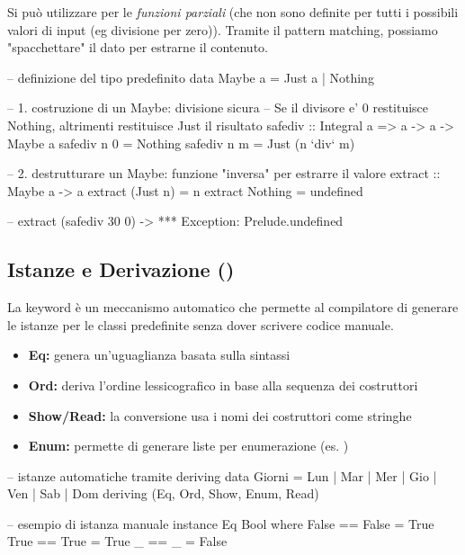 \documentclass[a4paper,11pt]{report}
\begin{document}
Si può utilizzare per le \textit{funzioni parziali} (che non sono definite per tutti i possibili valori di input (eg divisione per zero)). Tramite il pattern matching, possiamo "spacchettare" il dato per estrarne il contenuto.

\begin{haskellbox}{}
-- definizione del tipo predefinito
data Maybe a = Just a | Nothing

-- 1. costruzione di un Maybe: divisione sicura
-- Se il divisore e' 0 restituisce Nothing, altrimenti restituisce Just il risultato
safediv :: Integral a => a -> a -> Maybe a
safediv n 0 = Nothing
safediv n m = Just (n `div` m)

-- 2. destrutturare un Maybe: funzione "inversa" per estrarre il valore
extract :: Maybe a -> a
extract (Just n) = n
extract Nothing  = undefined 

-- extract (safediv 30 0) -> *** Exception: Prelude.undefined 
\end{haskellbox}

\subsection{Istanze e Derivazione ()}
La keyword  è un meccanismo automatico che permette al compilatore di generare le istanze per le classi predefinite senza dover scrivere codice manuale. 

\begin{itemize}
    \item \textbf{Eq:} genera un'uguaglianza basata sulla sintassi
    \item \textbf{Ord:} deriva l'ordine lessicografico in base alla sequenza dei costruttori
    \item \textbf{Show/Read:} la conversione usa i nomi dei costruttori come stringhe
    \item \textbf{Enum:} permette di generare liste per enumerazione (es. )
\end{itemize}

\begin{haskellbox}{}
-- istanze automatiche tramite deriving 
data Giorni = Lun | Mar | Mer | Gio | Ven | Sab | Dom
    deriving (Eq, Ord, Show, Enum, Read)

-- esempio di istanza manuale 
instance Eq Bool where
    False == False = True
    True == True   = True
    _ == _         = False
\end{haskellbox}
\end{document}
